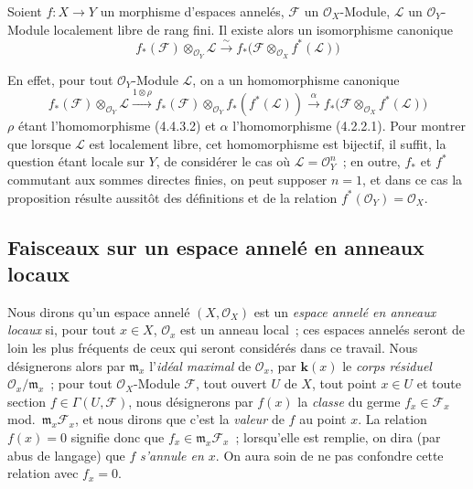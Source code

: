 \begin{env}[5.4.10]
\label{0.5.4.10-fr}
Soient $f:X\to Y$ un morphisme d'espaces annelés, $\mathcal{F}$ un
$\mathcal{O}_X$-Module, $\mathcal{L}$ un $\mathcal{O}_Y$-Module localement
libre de rang fini. Il existe alors un isomorphisme canonique
\[
  f_*(\mathcal{F})\otimes_{\mathcal{O}_Y}\mathcal{L}
  \xrightarrow{\sim}
  f_*\bigl(\mathcal{F}\otimes_{\mathcal{O}_X}f^*(\mathcal{L})\bigr)
  \tag{5.4.10.1}\label{0.5.4.10.1-fr}
\]


En effet, pour tout $\mathcal{O}_Y$-Module $\mathcal{L}$, on a un
homomorphisme canonique
\[
  f_*(\mathcal{F})\otimes_{\mathcal{O}_Y}\mathcal{L}
  \xrightarrow{1\otimes\rho}
  f_*(\mathcal{F})\otimes_{\mathcal{O}_Y}f_*(f^*(\mathcal{L}))
  \xrightarrow{\alpha}
  f_*\bigl(\mathcal{F}\otimes_{\mathcal{O}_X}f^*(\mathcal{L})\bigr)
\]
$\rho$ étant l'homomorphisme (4.4.3.2) et $\alpha$ l'homomorphisme (4.2.2.1).
Pour montrer que lorsque $\mathcal{L}$ est localement libre, cet homomorphisme
est bijectif, il suffit, la question étant locale sur $Y$, de considérer le
cas où $\mathcal{L}=\mathcal{O}_Y^n$~; en outre, $f_*$ et $f^*$ commutant aux
sommes directes finies, on peut supposer $n=1$, et dans ce cas la proposition
résulte aussitôt des définitions et de la relation
$f^*(\mathcal{O}_Y)=\mathcal{O}_X$.
\end{env}

\subsection{Faisceaux sur un espace annelé en anneaux locaux}
\label{subsection:0.5.5-fr}

\begin{env}[5.5.1]
\label{0.5.5.1-fr}
Nous dirons qu'un espace annelé $(X,\mathcal{O}_X)$ est un \emph{espace
annelé en anneaux locaux} si, pour tout $x\in X$, $\mathcal{O}_x$ est un
anneau local~; ces espaces annelés seront de loin les plus fréquents de ceux
qui seront considérés dans ce travail. Nous désignerons alors par
$\mathfrak{m}_x$ l'\emph{idéal maximal} de $\mathcal{O}_x$, par $\boldsymbol{k}(x)$ le
\emph{corps résiduel} $\mathcal{O}_x/\mathfrak{m}_x$~; pour tout
$\mathcal{O}_X$-Module $\mathcal{F}$, tout ouvert $U$ de $X$, tout point
$x\in U$ et toute section $f\in\Gamma(U,\mathcal{F})$, nous désignerons par
$f(x)$ la \emph{classe} du germe
$f_x\in\mathcal{F}_x$ mod.~$\mathfrak{m}_x\mathcal{F}_x$, et nous dirons que
c'est la \emph{valeur} de $f$ au point $x$. La relation $f(x)=0$ signifie
donc que $f_x\in\mathfrak{m}_x\mathcal{F}_x$~; lorsqu'elle est remplie, on dira
(par abus de langage) que $f$ \emph{s'annule en $x$}. On aura soin de ne pas
confondre cette relation avec $f_x=0$.
\end{env}

